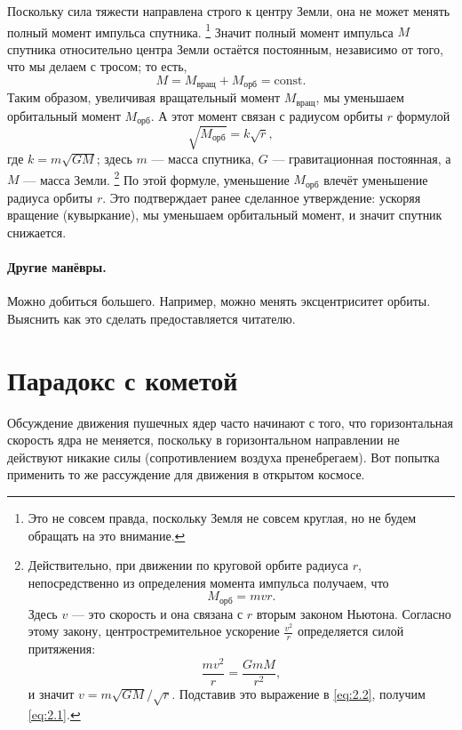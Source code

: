 Поскольку сила тяжести направлена строго к центру Земли, она не может менять полный момент импульса спутника.%
\footnote{Это не совсем правда, поскольку Земля не совсем круглая, но не будем обращать на это внимание.}
Значит полный момент импульса $M$ спутника относительно центра Земли остаётся постоянным, независимо от того, что мы делаем с тросом; то есть,
\[
M=M_{\text{вращ}}+M_{\text{орб}}=\mathrm{const}.
\]
Таким образом, увеличивая вращательный момент $M_{\text{вращ}}$, мы уменьшаем орбитальный момент $M_{\text{орб}}$.
А этот момент связан с радиусом орбиты $r$ формулой
\begin{equation}
\sqrt{M_{\text{орб}}}=k \sqrt{r},
\label{eq:2.1}
\end{equation}
где $k=m \sqrt{G M}$;
здесь $m$ --- масса спутника, $G$ --- гравитационная постоянная, а $M$ --- масса Земли.%
\footnote{Действительно, при движении по круговой орбите радиуса $r$, непосредственно из определения момента импульса получаем, что
\begin{equation}
M_{\text{орб}}=m v r. \label{eq:2.2}
\end{equation}
Здесь $v$ --- это скорость и она связана с $r$ вторым законом Ньютона.
Согласно этому закону, центростремительное ускорение $\frac{v^2}{r}$ определяется силой притяжения:
\[
\frac{m  v^2}{r}=\frac{G m M}{r^2},
\]
и значит
$v=m  \sqrt{G M}/\sqrt{r}$.
Подставив это выражение в \eqref{eq:2.2}, получим \eqref{eq:2.1}.}
По этой формуле, уменьшение $M_{\text{орб}}$ влечёт уменьшение радиуса орбиты $r$.
Это подтверждает ранее сделанное утверждение: ускоряя вращение (кувыркание), мы уменьшаем орбитальный момент, и значит спутник снижается.

\paragraph{Другие манёвры.}
Можно добиться большего.
Например, можно менять эксцентриситет орбиты.
Выяснить как это сделать предоставляется читателю.

\section{Парадокс с кометой}\label{Парадокс с кометой}

Обсуждение движения пушечных ядер часто начинают с того, что горизонтальная скорость ядра не меняется, поскольку в горизонтальном направлении не действуют никакие силы (сопротивлением воздуха пренебрегаем).
Вот попытка применить то же рассуждение для движения в открытом космосе.

